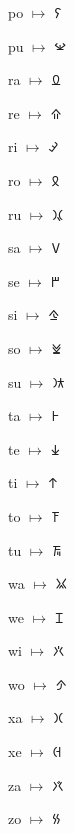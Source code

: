 {\noindent po $\mapsto$ {\cyfont 𐠡}\par
\noindent pu $\mapsto$ {\cyfont 𐠢}\par
\noindent ra $\mapsto$ {\cyfont 𐠣}\par
\noindent re $\mapsto$ {\cyfont 𐠤}\par
\noindent ri $\mapsto$ {\cyfont 𐠥}\par
\noindent ro $\mapsto$ {\cyfont 𐠦}\par
\noindent ru $\mapsto$ {\cyfont 𐠧}\par
\noindent sa $\mapsto$ {\cyfont 𐠨}\par
\noindent se $\mapsto$ {\cyfont 𐠩}\par
\noindent si $\mapsto$ {\cyfont 𐠪}\par
\noindent so $\mapsto$ {\cyfont 𐠫}\par
\noindent su $\mapsto$ {\cyfont 𐠬}\par
\noindent ta $\mapsto$ {\cyfont 𐠭}\par
\noindent te $\mapsto$ {\cyfont 𐠮}\par
\noindent ti $\mapsto$ {\cyfont 𐠯}\par
\noindent to $\mapsto$ {\cyfont 𐠰}\par
\noindent tu $\mapsto$ {\cyfont 𐠱}\par
\noindent wa $\mapsto$ {\cyfont 𐠲}\par
\noindent we $\mapsto$ {\cyfont 𐠳}\par
\noindent wi $\mapsto$ {\cyfont 𐠴}\par
\noindent wo $\mapsto$ {\cyfont 𐠵}\par
\noindent xa $\mapsto$ {\cyfont 𐠷}\par
\noindent xe $\mapsto$ {\cyfont 𐠸}\par
\noindent za $\mapsto$ {\cyfont 𐠼}\par
\noindent zo $\mapsto$ {\cyfont 𐠿}\par
}




